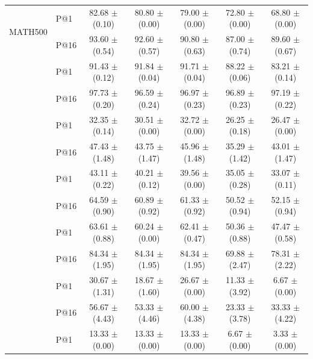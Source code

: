 \documentclass{article}
\begin{document}
{\begin{table}[H]
{\begin{tabular}{llccccc}
        \multirow{2}{*}{MATH500}        & P@1  & 82.68 $\pm$ (0.10) & 80.80 $\pm$ (0.00) & 79.00 $\pm$ (0.00)  & 72.80 $\pm$ (0.00) & 68.80 $\pm$ (0.00) \\
                                        & P@16 & 93.60 $\pm$ (0.54) & 92.60 $\pm$ (0.57) & 90.80 $\pm$ (0.63)  & 87.00 $\pm$ (0.74) & 89.60 $\pm$ (0.67) \\ \addlinespace[3pt]
        \multirow{2}{*}{GSM8K}          & P@1  & 91.43 $\pm$ (0.12) & 91.84 $\pm$ (0.04) & 91.71 $\pm$ (0.04)  & 88.22 $\pm$ (0.06) & 83.21 $\pm$ (0.14) \\
                                        & P@16 & 97.73 $\pm$ (0.20) & 96.59 $\pm$ (0.24) & 96.97 $\pm$ (0.23)  & 96.89 $\pm$ (0.23) & 97.19 $\pm$ (0.22) \\ \addlinespace[3pt]
        \multirow{2}{*}{MINERVA}        & P@1  & 32.35 $\pm$ (0.14) & 30.51 $\pm$ (0.00) & 32.72 $\pm$ (0.00)  & 26.25 $\pm$ (0.18) & 26.47 $\pm$ (0.00)\\
                                        & P@16 & 47.43 $\pm$ (1.48) & 43.75 $\pm$ (1.47) & 45.96 $\pm$ (1.48)  & 35.29 $\pm$ (1.42) & 43.01 $\pm$ (1.47) \\ \addlinespace[3pt]
        \multirow{2}{*}{OLYMPIAD}       & P@1  & 43.11 $\pm$ (0.22) & 40.21 $\pm$ (0.12) & 39.56 $\pm$ (0.00)  & 35.05 $\pm$ (0.28) & 33.07 $\pm$ (0.11) \\
                                        & P@16 & 64.59 $\pm$ (0.90) & 60.89 $\pm$ (0.92) & 61.33 $\pm$ (0.92)  & 50.52 $\pm$ (0.94) & 52.15 $\pm$ (0.94) \\ \addlinespace[3pt]
        \multirow{2}{*}{AMC}            & P@1  & 63.61 $\pm$ (0.88) & 60.24 $\pm$ (0.00) & 62.41 $\pm$ (0.47)  & 50.36 $\pm$ (0.88) & 47.47 $\pm$ (0.58) \\
                                        & P@16 & 84.34 $\pm$ (1.95) & 84.34 $\pm$ (1.95) & 84.34 $\pm$ (1.95)  & 69.88 $\pm$ (2.47) & 78.31 $\pm$ (2.22) \\ \addlinespace[3pt]
        \multirow{2}{*}{AIME 24}        & P@1  & 30.67 $\pm$ (1.31) & 18.67 $\pm$ (1.60) & 26.67 $\pm$ (0.00)  & 11.33 $\pm$ (3.92) & 6.67  $\pm$ (0.00) \\
                                        & P@16 & 56.67 $\pm$ (4.43) & 53.33 $\pm$ (4.46) & 60.00 $\pm$ (4.38)  & 23.33 $\pm$ (3.78) & 33.33 $\pm$ (4.22) \\ \addlinespace[3pt]
        \multirow{2}{*}{AIME 25}        & P@1  & 13.33 $\pm$ (0.00) & 13.33 $\pm$ (0.00) & 13.33 $\pm$ (0.00)  & 6.67 $\pm$ (0.00) & 3.33  $\pm$ (0.00) \\

\end{tabular}}
\end{table}}
\end{document}
